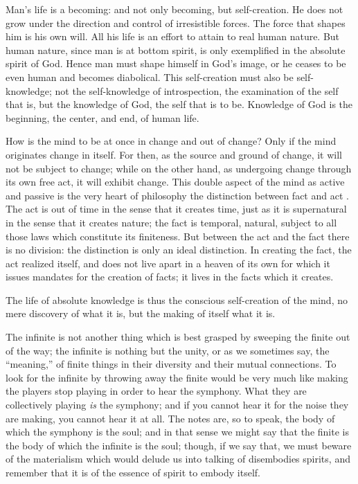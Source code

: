 \begin{quotationx}
Man's life is a becoming: and not only becoming, but self-creation. He does not grow under the direction and control of irresistible forces. The force that shapes him is his own will. All his life is an effort to attain to real human nature. But human nature, since man is at bottom spirit, is only exemplified in the absolute spirit of God. Hence man must shape himself in God's image, or he ceases to be even human and becomes diabolical. This self-creation must also be self-knowledge; not the self-knowledge of introspection, the examination of the self that is, but the knowledge of God, the self that is to be. Knowledge of God is the beginning, the center, and end, of human life.

How is the mind to be at once in change and out of change? Only if the mind originates change in itself. For then, as the source and ground of change, it will not be subject to change; while on the other hand, as undergoing change through its own free act, it will exhibit change. This double aspect of the mind as active and passive is the very heart of philosophy the distinction between fact and act . The act is out of time in the sense that it creates time, just as it is supernatural in the sense that it creates nature; the fact is temporal, natural, subject to all those laws which constitute its finiteness. But between the act and the fact there is no division: the distinction is only an ideal distinction. In creating the fact, the act realized itself, and does not live apart in a heaven of its own for which it issues mandates for the creation of facts; it lives in the facts which it creates.

The life of absolute knowledge is thus the conscious self-creation of the mind, no mere discovery of what it is, but the making of itself what it is.

The infinite is not another thing which is best grasped by sweeping the finite out of the way; the infinite is nothing but the unity, or as we sometimes say, the ``meaning,'' of finite things in their diversity and their mutual connections. To look for the infinite by throwing away the finite would be very much like making the players stop playing in order to hear the symphony. What they are collectively playing \emph{is} the symphony; and if you cannot hear it for the noise they are making, you cannot hear it at all. The notes are, so to speak, the body of which the symphony is the soul; and in that sense we might say that the finite is the body of which the infinite is the soul; though, if we say that, we must beware of the materialism which would delude us into talking of disembodies spirits, and remember that it is of the essence of spirit to embody itself.
\end{quotationx}


